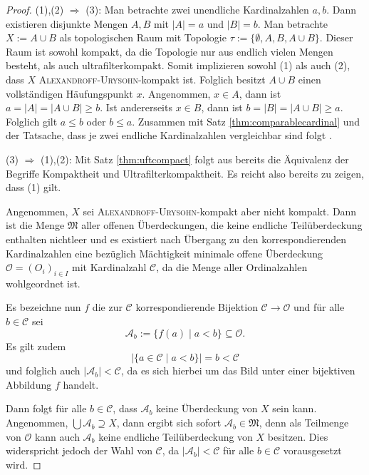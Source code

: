 \begin{proof}
  (1),(2) $\Rightarrow$ (3):
  Man betrachte zwei unendliche Kardinalzahlen $a,b$.
  Dann existieren disjunkte Mengen $A,B$ mit $|A| = a$ und $|B| = b$.
  Man betrachte $X := A \cup B$ als topologischen Raum mit Topologie $\tau := \{\emptyset, A, B, A \cup B\}$.
  Dieser Raum ist sowohl kompakt, da die Topologie nur aus endlich vielen Mengen besteht, als auch ultrafilterkompakt. 
  Somit implizieren sowohl (1) als auch (2), dass $X$ \textsc{Alexandroff}\hyp{}\textsc{Urysohn}\hyp{}kompakt ist.
  Folglich besitzt $A \cup B$ einen vollständigen Häufungspunkt $x$.
  Angenommen, $x \in A$, dann ist $a = |A| = |A \cup B| \geq b$. 
  Ist andererseits $x \in B$, dann ist $b = |B| = |A \cup B| \geq a$.
  Folglich gilt $a \leq b$ oder $b \leq a$.
  Zusammen mit Satz \ref{thm:comparablecardinal} und der Tatsache, dass je zwei endliche Kardinalzahlen vergleichbar sind folgt \AC.

  (3) $\Rightarrow$ (1),(2):
  Mit Satz \ref{thm:uftcompact} folgt aus \UFT bereits die Äquivalenz der Begriffe Kompaktheit und Ultrafilterkompaktheit.
  Es reicht also bereits zu zeigen, dass (1) gilt.

  Angenommen, $X$ sei \textsc{Alexandroff}\hyp{}\textsc{Urysohn}\hyp{}kompakt aber nicht kompakt.
  Dann ist die Menge $\mathfrak{M}$ aller offenen Überdeckungen, die keine endliche Teilüberdeckung enthalten nichtleer und es existiert nach Übergang zu den korrespondierenden Kardinalzahlen eine bezüglich Mächtigkeit minimale offene Überdeckung $\mathcal{O} = (O_i)_{i \in I}$ mit Kardinalzahl $\mathcal{C}$, da die Menge aller Ordinalzahlen wohlgeordnet ist.

  Es bezeichne nun $f$ die zur $\mathcal{C}$ korrespondierende Bijektion $\mathcal{C} \to \mathcal{O}$ und für alle $b \in \mathcal{C}$ sei 
  \begin{displaymath}
    \mathcal{A}_b := \{ f(a) \mid a < b\} \subseteq \mathcal{O}.
  \end{displaymath}
  Es gilt zudem
  \begin{displaymath}
    | \{ a \in \mathcal{C} \mid a < b \} | = b < \mathcal{C}
  \end{displaymath}
  und folglich auch $| \mathcal{A}_b | < \mathcal{C}$, da es sich hierbei um das Bild unter einer bijektiven Abbildung $f$ handelt.

  Dann folgt für alle $b \in \mathcal{C}$, dass $\mathcal{A}_b$ keine Überdeckung von $X$ sein kann.
  Angenommen, $\bigcup \mathcal{A}_b \supseteq X$, dann ergibt sich sofort $\mathcal{A}_b \in \mathfrak{M}$, denn als Teilmenge von $\mathcal{O}$ kann auch $\mathcal{A}_b$ keine endliche Teilüberdeckung von $X$ besitzen.
  Dies widerspricht jedoch der Wahl von $\mathcal{C}$, da $|\mathcal{A}_b| < \mathcal{C}$ für alle $b \in \mathcal{C}$ vorausgesetzt wird.


\end{proof}
